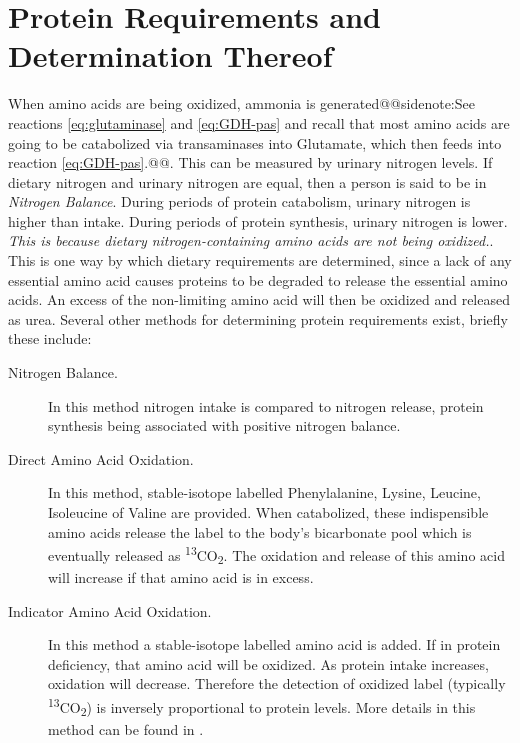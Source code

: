 \documentclass{tufte-handout}
\makeatletter
\def\sidenote#1{@@sidenote:#1@@}
\makeatother
\begin{document}
\section{Protein Requirements and Determination Thereof}
When amino acids are being oxidized, ammonia is generated\sidenote{See reactions \ref{eq:glutaminase} and \ref{eq:GDH-pas} and recall that most amino acids are going to be catabolized via transaminases into Glutamate, which then feeds into reaction \ref{eq:GDH-pas}.}. This can be measured by urinary nitrogen levels.  If dietary nitrogen and urinary nitrogen are equal, then a person is said to be in \emph{Nitrogen Balance}.  During periods of protein catabolism, urinary nitrogen is higher than intake.  During periods of protein synthesis, urinary nitrogen is lower.  \emph{This is because dietary nitrogen-containing amino acids are not being oxidized.}.  This is one way by which dietary requirements are determined, since a lack of any essential amino acid causes proteins to be degraded to release the essential amino acids.  An excess of the non-limiting amino acid will then be oxidized and released as urea.  Several other methods for determining protein requirements exist, briefly these include:

\begin{description}
\item [Nitrogen Balance.]  In this method nitrogen intake is compared to nitrogen release, protein synthesis being associated with positive nitrogen balance.
\item [Direct Amino Acid Oxidation.]  In this method, stable-isotope labelled Phenylalanine, Lysine, Leucine, Isoleucine of Valine are provided.   When catabolized, these indispensible amino acids release the label to the body's bicarbonate pool which is eventually released as \textsuperscript{13}CO\textsubscript{2}.  The oxidation and release of this amino acid will increase if that amino acid is in excess.
\item [Indicator Amino Acid Oxidation.] In this method a stable-isotope labelled amino acid is added.  If in protein deficiency, that amino acid will be oxidized.  As protein intake increases, oxidation will decrease.  Therefore the detection of oxidized label (typically \textsuperscript{13}CO\textsubscript{2}) is inversely proportional to protein levels.  More details in this method can be found in \citet{Elango2008}.
\end{description}
\end{document}
